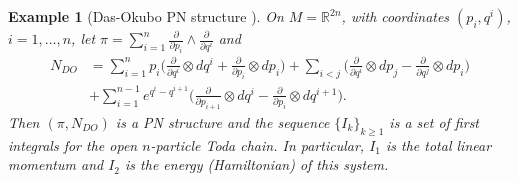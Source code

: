 \documentclass[12pt]{article}
\newtheorem{example}[theorem]{Example}
\begin{document}
\begin{example}[Das-Okubo PN structure \cite{DO}]
\label{ex:1}
On $M=\mathbb R^{2n}$, with coordinates $(p_i,q^i)$, $i=1,\dots,n$, let $\pi=\sum_{i=1}^{n}\frac{\partial}{\partial p_i}\wedge\frac{\partial}{\partial q^i}$ and 
\begin{equation}
\begin{split}
N_{DO}&=\sum_{i=1}^n p_i\Big(\frac{\partial}{\partial q^i}\otimes dq^i
+\frac{\partial}{\partial p_i}\otimes dp_i\Big)+\sum_{i<j}\Big(\frac{\partial}{\partial q^i}\otimes dp_j-\frac{\partial}{\partial q^j}\otimes dp_i\Big)\\
&+\sum_{i=1}^{n-1}e^{q^i-q^{i+1}}\Big(\frac{\partial}{\partial p_{i+1}}\otimes dq^i-\frac{\partial}{\partial p_i}\otimes dq^{i+1}\Big).\label{eq:DO-PN}
\end{split}
\end{equation}
Then $(\pi,N_{DO})$ is a PN structure and the sequence $\{I_k\}_{k\geq 1}$ is a set of first integrals for the \emph{open $n$-particle Toda chain}. In particular, $I_1$ is the total linear momentum and $I_2$ is the energy (Hamiltonian) of this system.
\end{example}
\end{document}

